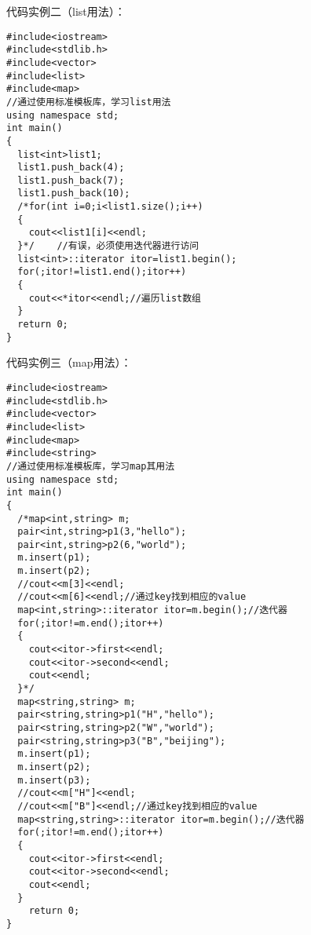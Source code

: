 \documentclass{article}
\begin{document}
\begin{CJK}{UTF8}{gbsn}
代码实例二（list用法）：
\begin{verbatim}
#include<iostream>
#include<stdlib.h>
#include<vector>
#include<list>
#include<map>
//通过使用标准模板库，学习list用法
using namespace std;
int main()
{
  list<int>list1;
  list1.push_back(4);
  list1.push_back(7);
  list1.push_back(10);
  /*for(int i=0;i<list1.size();i++)
  {
    cout<<list1[i]<<endl;
  }*/    //有误，必须使用迭代器进行访问
  list<int>::iterator itor=list1.begin();
  for(;itor!=list1.end();itor++)
  {
    cout<<*itor<<endl;//遍历list数组
  }
  return 0;
}
\end{verbatim}
代码实例三（map用法）：
\begin{verbatim}
#include<iostream>
#include<stdlib.h>
#include<vector>
#include<list>
#include<map>
#include<string>
//通过使用标准模板库，学习map其用法
using namespace std;
int main()
{
  /*map<int,string> m;
  pair<int,string>p1(3,"hello");
  pair<int,string>p2(6,"world");
  m.insert(p1);
  m.insert(p2);
  //cout<<m[3]<<endl;
  //cout<<m[6]<<endl;//通过key找到相应的value
  map<int,string>::iterator itor=m.begin();//迭代器
  for(;itor!=m.end();itor++)
  {
    cout<<itor->first<<endl;
    cout<<itor->second<<endl;
    cout<<endl;
  }*/
  map<string,string> m;
  pair<string,string>p1("H","hello");
  pair<string,string>p2("W","world");
  pair<string,string>p3("B","beijing");
  m.insert(p1);
  m.insert(p2);
  m.insert(p3);
  //cout<<m["H"]<<endl;
  //cout<<m["B"]<<endl;//通过key找到相应的value
  map<string,string>::iterator itor=m.begin();//迭代器
  for(;itor!=m.end();itor++)
  {
    cout<<itor->first<<endl;
    cout<<itor->second<<endl;
    cout<<endl;
  }
    return 0;
}
\end{verbatim}
\end{CJK}
\end{document}
